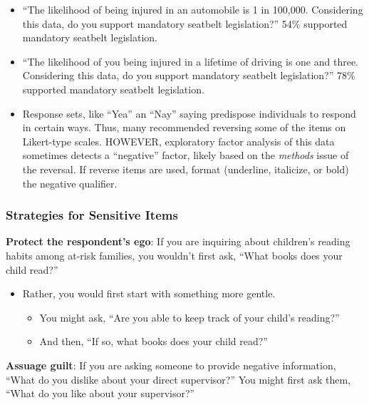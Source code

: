 \documentclass[
  english,
]{book}
\providecommand{\tightlist}{%
  \setlength{\itemsep}{0pt}\setlength{\parskip}{0pt}}
\begin{document}
\begin{itemize}
  \begin{itemize}
  \tightlist
  \item
    ``The likelihood of being injured in an automobile is 1 in 100,000. Considering this data, do you support mandatory seatbelt legislation?'' 54\% supported mandatory seatbelt legislation.
  \item
    ``The likelihood of you being injured in a lifetime of driving is one and three. Considering this data, do you support mandatory seatbelt legislation?'' 78\% supported mandatory seatbelt legislation.
  \item
    Response sets, like ``Yea'' an ``Nay'' saying predispose individuals to respond in certain ways. Thus, many recommended reversing some of the items on Likert-type scales. HOWEVER, exploratory factor analysis of this data sometimes detects a ``negative'' factor, likely based on the \emph{methods} issue of the reversal. If reverse items are used, format (underline, italicize, or bold) the negative qualifier.
  \end{itemize}
\end{itemize}

\hypertarget{strategies-for-sensitive-items}{%
\subsubsection{Strategies for Sensitive Items}\label{strategies-for-sensitive-items}}

\textbf{Protect the respondent's ego}: If you are inquiring about children's reading habits among at-risk families, you wouldn't first ask, ``What books does your child read?''

\begin{itemize}
\tightlist
\item
  Rather, you would first start with something more gentle.

  \begin{itemize}
  \tightlist
  \item
    You might ask, ``Are you able to keep track of your child's reading?''
  \item
    And then, ``If so, what books does your child read?''
  \end{itemize}
\end{itemize}

\textbf{Assuage guilt}: If you are asking someone to provide negative information, ``What do you dislike about your direct supervisor?'' You might first ask them, ``What do you like about your supervisor?''
\end{document}
